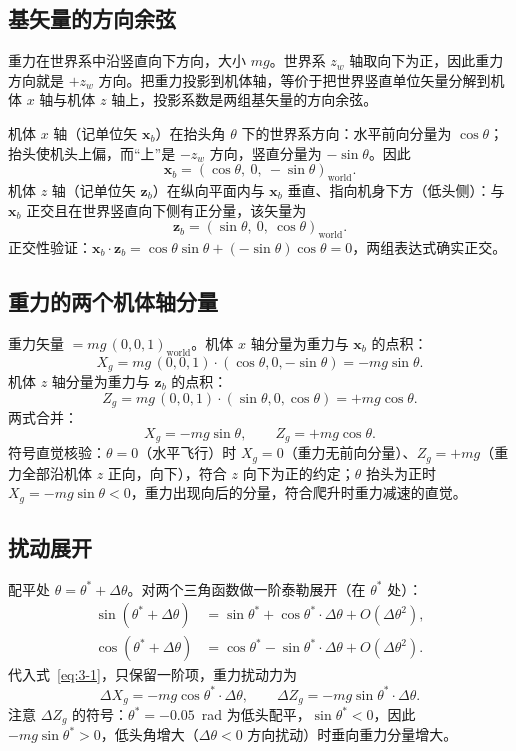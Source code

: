 \documentclass[11pt,a4paper]{ctexart}
\newcommand{\bvec}[1]{\boldsymbol{#1}}
\begin{document}
\subsection{基矢量的方向余弦}

重力在世界系中沿竖直向下方向，大小 $m g$。世界系 $z_w$ 轴取向下为正，因此重力方向就是 $+z_w$ 方向。把重力投影到机体轴，等价于把世界竖直单位矢量分解到机体 $x$ 轴与机体 $z$ 轴上，投影系数是两组基矢量的方向余弦。

机体 $x$ 轴（记单位矢 $\bvec{x}_b$）在抬头角 $\theta$ 下的世界系方向：水平前向分量为 $\cos\theta$；抬头使机头上偏，而“上”是 $-z_w$ 方向，竖直分量为 $-\sin\theta$。因此
\[
\bvec{x}_b = (\cos\theta,\ 0,\ -\sin\theta)_{\text{world}}.
\]
机体 $z$ 轴（记单位矢 $\bvec{z}_b$）在纵向平面内与 $\bvec{x}_b$ 垂直、指向机身下方（低头侧）：与 $\bvec{x}_b$ 正交且在世界竖直向下侧有正分量，该矢量为
\[
\bvec{z}_b = (\sin\theta,\ 0,\ \cos\theta)_{\text{world}}.
\]
正交性验证：$\bvec{x}_b\cdot\bvec{z}_b = \cos\theta\sin\theta + (-\sin\theta)\cos\theta = 0$，两组表达式确实正交。

\subsection{重力的两个机体轴分量}

重力矢量 $= m g\,(0,0,1)_{\text{world}}$。机体 $x$ 轴分量为重力与 $\bvec{x}_b$ 的点积：
\[
X_g = m g\,(0,0,1)\cdot(\cos\theta,0,-\sin\theta) = -m g\sin\theta.
\]
机体 $z$ 轴分量为重力与 $\bvec{z}_b$ 的点积：
\[
Z_g = m g\,(0,0,1)\cdot(\sin\theta,0,\cos\theta) = +m g\cos\theta.
\]
两式合并：
\begin{equation}\label{eq:3-1}
X_g = -m g\sin\theta, \qquad Z_g = +m g\cos\theta.
\tag{(3-1)}
\end{equation}
符号直觉核验：$\theta=0$（水平飞行）时 $X_g=0$（重力无前向分量）、$Z_g=+mg$（重力全部沿机体 $z$ 正向，向下），符合 $z$ 向下为正的约定；$\theta$ 抬头为正时 $X_g=-mg\sin\theta<0$，重力出现向后的分量，符合爬升时重力减速的直觉。

\subsection{扰动展开}

配平处 $\theta=\theta^{*}+\Delta\theta$。对两个三角函数做一阶泰勒展开（在 $\theta^{*}$ 处）：
\begin{align*}
\sin(\theta^{*}+\Delta\theta) &= \sin\theta^{*} + \cos\theta^{*}\cdot\Delta\theta + O(\Delta\theta^2),\\
\cos(\theta^{*}+\Delta\theta) &= \cos\theta^{*} - \sin\theta^{*}\cdot\Delta\theta + O(\Delta\theta^2).
\end{align*}
代入式~\eqref{eq:3-1}，只保留一阶项，重力扰动力为
\begin{equation}\label{eq:3-2}
\Delta X_g = -m g\cos\theta^{*}\cdot\Delta\theta, \qquad
\Delta Z_g = -m g\sin\theta^{*}\cdot\Delta\theta.
\tag{(3-2)}
\end{equation}
注意 $\Delta Z_g$ 的符号：$\theta^{*}=-0.05$~rad 为低头配平，$\sin\theta^{*}<0$，因此 $-mg\sin\theta^{*}>0$，低头角增大（$\Delta\theta<0$ 方向扰动）时垂向重力分量增大。
\end{document}
